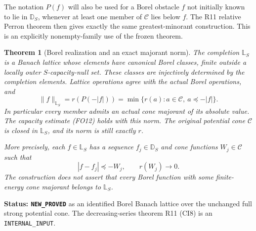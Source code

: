 \documentclass[11pt,a4paper]{article}
\numberwithin{equation}{section}
\newtheorem{theorem}{Theorem}[section]
\theoremstyle{definition}
\theoremstyle{remark}
\begin{document}
The notation $P(f)$ will also be used for a Borel obstacle
$f$ not initially known to lie in $\mathbb D_S$, whenever
at least one member of $\mathscr C$ lies below $f$.
The R11 relative Perron theorem then gives exactly the same
greatest-minorant construction.  This is an explicitly
nonempty-family use of the frozen theorem.

\begin{theorem}[Borel realization and an exact majorant norm]
\label{thm:r12-Borel-order-lattice}
The completion $\mathbb L_S$ is a Banach lattice whose
elements have canonical Borel classes, finite outside a
locally outer $S$-capacity-null set.  These classes are
injectively determined by the completion elements.  Lattice
operations agree with the actual Borel operations, and
\[
 \boxed{\qquad
 \|f\|_{\mathbb L_S}
    =r(P(-|f|))
    =\min\{r(a):a\in\mathscr C,\ a\preceq-|f|\}.
 \qquad}
 \tag{OL1}
\]
In particular every member admits an actual cone majorant
of its absolute value.  The capacity estimate
\textup{(FO12)} holds with this norm.  The original potential
cone $\mathscr C$ is closed in $\mathbb L_S$, and its norm
is still exactly $r$.

More precisely, each $f\in\mathbb L_S$ has a sequence
$f_j\in\mathbb D_S$ and cone functions $W_j\in\mathscr C$
such that
\[
 |f-f_j|\preceq-W_j,\qquad r(W_j)\longrightarrow0.
 \tag{OL2}
\]
The construction does not assert that every Borel function
with some finite-energy cone majorant belongs to $\mathbb L_S$.
\end{theorem}

\noindent\textbf{Status: \texttt{NEW\_PROVED}} as an
identified Borel Banach lattice over the unchanged full
strong potential cone.  The decreasing-series theorem R11
\textup{(CI8)} is an \texttt{INTERNAL\_INPUT}.
\end{document}
